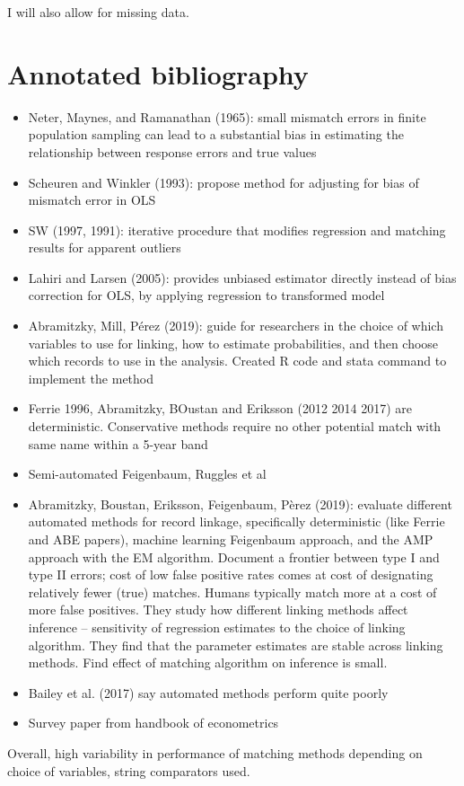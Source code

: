\documentclass[12pt]{article}
\begin{document}


I will also allow for missing data. 

\section{Annotated bibliography}
\begin{itemize}
\item Neter, Maynes, and Ramanathan (1965): small mismatch errors in finite population sampling can lead to a substantial bias in estimating the relationship between response errors and true values
\item Scheuren and Winkler (1993): propose method for adjusting for bias of mismatch error in OLS
\item SW (1997, 1991): iterative procedure that modifies regression and matching results for apparent outliers 
\item Lahiri and Larsen (2005):   provides unbiased estimator directly instead of bias correction for OLS, by applying regression to transformed model 
\item Abramitzky, Mill, P\'erez (2019): guide for researchers in the choice of which variables to use for linking, how to estimate probabilities, and then choose which records to use in the analysis.  Created R code and stata command to implement the method
\item Ferrie 1996, Abramitzky, BOustan and Eriksson (2012 2014 2017) are deterministic.  Conservative methods require no other potential match with same name within a 5-year band
\item Semi-automated Feigenbaum, Ruggles et al 
\item Abramitzky, Boustan, Eriksson, Feigenbaum, P\`erez (2019): evaluate different automated methods for record linkage, specifically deterministic (like Ferrie and ABE papers), machine learning Feigenbaum approach, and the AMP approach with the EM algorithm.  Document a frontier between type I and type II errors; cost of low false positive rates comes at cost of designating relatively fewer (true) matches.  Humans typically match more at a cost of more false positives.  They study how different linking methods affect inference -- sensitivity of regression estimates to the choice of linking algorithm.  They find that the parameter estimates are stable across linking methods.  Find effect of matching algorithm on inference is small. 
\item Bailey et al. (2017) say automated methods perform quite poorly
\item Survey paper from handbook of econometrics
\end{itemize}

Overall, high variability in performance of matching methods depending on choice of variables, string comparators used. 
\end{document}
